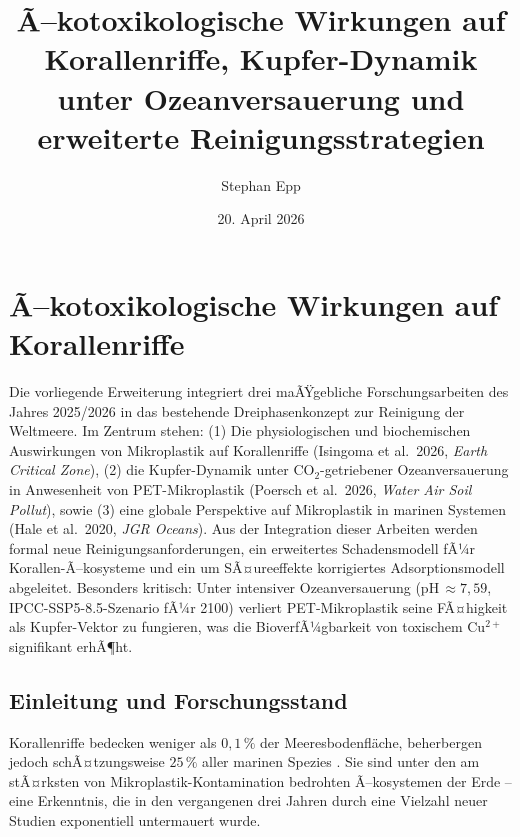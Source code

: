 ﻿\documentclass[12pt,a4paper]{article}
\title{Ã–kotoxikologische Wirkungen auf Korallenriffe, Kupfer-Dynamik unter Ozeanversauerung und erweiterte Reinigungsstrategien}
\author{Stephan Epp}
\date{20. April 2026}
\theoremstyle{definition}
\theoremstyle{remark}
\newcommand{\MP}{Mikroplastik}
\begin{document}
\maketitle
\tableofcontents
\newpage

\section{Ã–kotoxikologische Wirkungen auf Korallenriffe}
\label{sec:korallen_oekotox}

Die vorliegende Erweiterung integriert drei maÃŸgebliche Forschungsarbeiten des
Jahres 2025/2026 in das bestehende Dreiphasenkonzept zur Reinigung der Weltmeere.
Im Zentrum stehen: (1) Die physiologischen und biochemischen Auswirkungen von
\MP{} auf Korallenriffe (Isingoma et al.\ 2026, \textit{Earth Critical Zone}),
(2) die Kupfer-Dynamik unter CO$_2$-getriebener Ozeanversauerung in Anwesenheit von
PET-Mikroplastik (Poersch et al.\ 2026, \textit{Water Air Soil Pollut}), sowie
(3) eine globale Perspektive auf \MP{} in marinen Systemen (Hale et al.\ 2020,
\textit{JGR Oceans}). Aus der Integration dieser Arbeiten werden formal neue
Reinigungsanforderungen, ein erweitertes Schadensmodell fÃ¼r Korallen-Ã–kosysteme
und ein um SÃ¤ureeffekte korrigiertes Adsorptionsmodell abgeleitet.
Besonders kritisch: Unter intensiver Ozeanversauerung (pH\,$\approx 7{,}59$,
IPCC-SSP5-8.5-Szenario fÃ¼r 2100) verliert PET-Mikroplastik seine FÃ¤higkeit als
Kupfer-Vektor zu fungieren, was die BioverfÃ¼gbarkeit von toxischem Cu$^{2+}$
signifikant erhÃ¶ht.

\subsection{Einleitung und Forschungsstand}

Korallenriffe bedecken weniger als $0{,}1\,\%$ der Meeresbodenfl\"ache, beherbergen
jedoch schÃ¤tzungsweise $25\,\%$ aller marinen Spezies
\cite{plaisance2011diversity}. Sie sind unter den am stÃ¤rksten von \MP{}-Kontamination
bedrohten Ã–kosystemen der Erde -- eine Erkenntnis, die in den vergangenen drei
Jahren durch eine Vielzahl neuer Studien exponentiell untermauert wurde.
\end{document}
